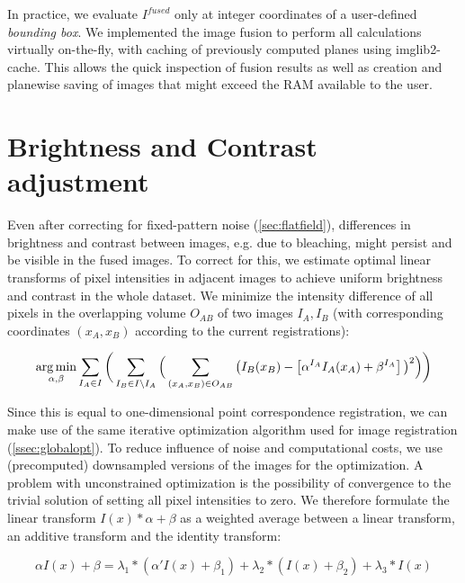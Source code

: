 In practice, we evaluate $I^{fused}$ only at integer coordinates of a user-defined \emph{bounding box}. We implemented the image fusion to perform all calculations virtually on-the-fly, with caching of previously computed planes using imglib2-cache. This allows the quick inspection of fusion results as well as creation and planewise saving of images that might exceed the RAM available to the user.

\section{Brightness and Contrast adjustment}
\label{sec:brightness-adjust}

Even after correcting for fixed-pattern noise (\ref{sec:flatfield}), differences in brightness and contrast between images, e.g. due to bleaching, might persist and be visible in the fused images. To correct for this, we estimate optimal linear transforms of pixel intensities in adjacent images \cite{blasse2017premosa} to achieve uniform brightness and contrast in the whole dataset. We minimize the intensity difference of all pixels in the overlapping volume $O_{AB}$ of two images $I_A, I_B$ (with corresponding coordinates $(x_A, x_B)$ according to the current registrations): 

\begin{equation}
\label{eq:brighness-adjust-1}
\operatorname*{arg\,min}_{\alpha, \beta} \sum_{I_A  \in I}  \bigg( \sum_{I_B \in I \setminus I_A} \Big( \sum_{(x_A, x_B) \in O_{AB}} \big( I_B(x_B) - \left[ \alpha^{I_A} I_A(x_A) + \beta^{I_A} \right] \big)^2 \Big)\bigg)
\end{equation}

Since this is equal to one-dimensional point correspondence registration, we can make use of the same iterative optimization algorithm used for image registration (\ref{ssec:globalopt}). To reduce influence of noise and computational costs, we use (precomputed) downsampled versions of the images for the optimization. A problem with unconstrained optimization is the possibility of convergence to the trivial solution of setting all pixel intensities to zero. We therefore formulate the linear transform $I(x)*\alpha + \beta$ as a weighted average between a linear transform, an additive transform and the identity transform:

\begin{equation}
\label{eq:brighness-adjust-2}
\alpha I(x) + \beta = \lambda_1 * (\alpha' I(x) + \beta_1) + \lambda_2 * (I(x) + \beta_2) + \lambda_3 * I(x) 
\end{equation}


